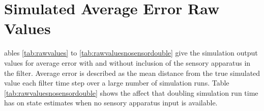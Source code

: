 %
%

\chapter{Simulated Average Error Raw Values}
\label{app:rawvalues}

ables \ref{tab:rawvalues} to \ref{tab:rawvaluesnosensordouble} give the simulation output values for average error with and without inclusion of the sensory apparatus in the filter. Average error is described as the mean distance from the true simulated value each filter time step over a large number of simulation runs. Table \ref{tab:rawvaluesnosensordouble} shows the affect that doubling simulation run time has on state estimates when no sensory apparatus input is available.

